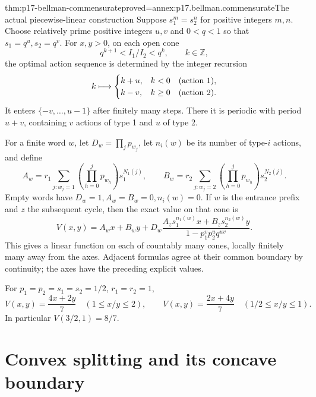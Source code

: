 \begin{hbtheorem}{thm:p17-bellman-commensurate}{proved=annex:p17.bellman.commensurate}{The actual piecewise-linear construction}
Suppose \(s_1^m=s_2^n\) for positive integers \(m,n\).
Choose relatively prime positive integers \(u,v\) and
\(0<q<1\) so that \(s_1=q^u,s_2=q^v\).
For \(x,y>0\), on each open cone
\[
                       q^{k+1}<I_1/I_2<q^k,\qquad k\in\mathbb Z,
\]
the optimal action sequence is determined by the integer recursion
\[
       k\longmapsto
       \begin{cases}k+u,&k<0\quad(\hbox{action 1}),\\
                     k-v,&k\geq0\quad(\hbox{action 2}).\end{cases}
\]
It enters \(\{-v,\ldots,u-1\}\) after finitely many steps.
There it is periodic with period \(u+v\), containing
\(v\) actions of type 1 and \(u\) of type 2.

For a finite word \(w\), let \(D_w=\prod_jp_{w_j}\),
let \(n_i(w)\) be its number of type-\(i\) actions, and define
\[
 A_w=r_1\sum_{j:w_j=1}\left(\prod_{h=0}^j p_{w_h}\right)s_1^{N_1(j)},
 \qquad
 B_w=r_2\sum_{j:w_j=2}\left(\prod_{h=0}^j p_{w_h}\right)s_2^{N_2(j)}.
\]
Empty words have \(D_w=1,A_w=B_w=0,n_i(w)=0\).
If \(w\) is the entrance prefix and \(z\) the subsequent
cycle, then the exact value on that cone is
\[
 V(x,y)=A_wx+B_wy+
 D_w\frac{A_zs_1^{n_1(w)}x+B_zs_2^{n_2(w)}y}
                     {1-p_1^v p_2^u q^{uv}}.
\]
This gives a linear function on each of countably many cones,
locally finitely many away from the axes. Adjacent formulas
agree at their common boundary by continuity; the axes have
the preceding explicit values.

For \(p_1=p_2=s_1=s_2=1/2\), \(r_1=r_2=1\),
\[
             V(x,y)=\frac{4x+2y}{7}\quad(1\leq x/y\leq2),
 \qquad
             V(x,y)=\frac{2x+4y}{7}\quad(1/2\leq x/y\leq1).
\]
In particular \(V(3/2,1)=8/7\).
\end{hbtheorem}

\section{Convex splitting and its concave boundary}

